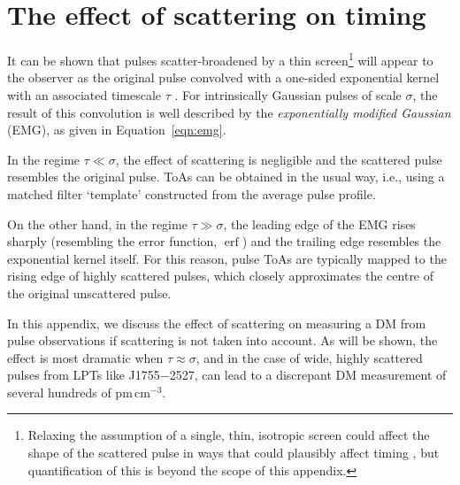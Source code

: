 \documentclass[fleqn,usenatbib]{mnras}
\newcommand{\src}{J1755$-$2527}
\DeclareMathOperator{\erf}{erf}
\newcommand{\Eqn}{Equation}
\begin{document}



\appendix

\section{The effect of scattering on timing}
\label{app:scattering_dm}

It can be shown that pulses scatter-broadened by a thin screen\footnote{Relaxing the assumption of a single, thin, isotropic screen could affect the shape of the scattered pulse in ways that could plausibly affect timing \citep{2009MNRAS.395.1391R}, but quantification of this is beyond the scope of this appendix.} will appear to the observer as the original pulse convolved with a one-sided exponential kernel with an associated timescale $\tau$ \citep{1972MNRAS.157...55W,1973MNRAS.163..345W}.
For intrinsically Gaussian pulses of scale $\sigma$, the result of this convolution is well described by the \textit{exponentially modified Gaussian} (EMG), as given in \Eqn~\ref{eqn:emg}.

In the regime $\tau \ll \sigma$, the effect of scattering is negligible and the scattered pulse resembles the original pulse.
ToAs can be obtained in the usual way, i.e., using a matched filter `template' constructed from the average pulse profile.

On the other hand, in the regime $\tau \gg \sigma$, the leading edge of the EMG rises sharply (resembling the error function, $\erf$) and the trailing edge resembles the exponential kernel itself.
For this reason, pulse ToAs are typically mapped to the rising edge of highly scattered pulses, which closely approximates the centre of the original unscattered pulse.

In this appendix, we discuss the effect of scattering on measuring a DM from pulse observations if scattering is not taken into account.
As will be shown, the effect is most dramatic when $\tau \approx \sigma$, and in the case of wide, highly scattered pulses from LPTs like \src{}, can lead to a discrepant DM measurement of several hundreds of pm\,cm$^{-3}$.
\end{document}

